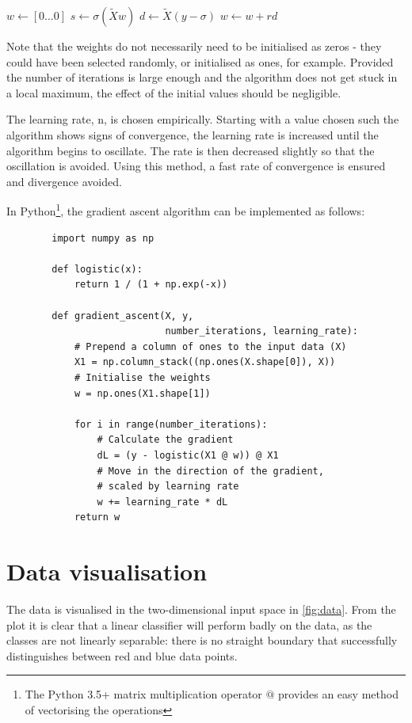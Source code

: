 \documentclass[a4paper]{article}
\begin{document}
    \begin{algorithmic}
            \State $w \gets [0 \dots 0]$ 
                \State $s \gets \sigma(\tilde{X}w)$
                \State $d \gets \tilde{X} (y - \sigma)$ 
                \State $w \gets w + rd $ 
            \EndFor
        \EndProcedure
    \end{algorithmic}

    Note that the weights do not necessarily need to be initialised as zeros - they could have been selected randomly, or
    initialised as ones, for example. Provided the number of iterations is large enough and the algorithm does not get
    stuck in a local maximum, the effect of the initial values should be negligible.

    The learning rate, n, is chosen empirically. Starting with a value chosen such the algorithm shows signs
    of convergence, the learning rate is increased until the algorithm begins to oscillate. The rate is then decreased
    slightly so that the oscillation is avoided. Using this method, a fast rate of convergence is ensured and divergence
    avoided.

    In Python\footnote{The Python 3.5+ matrix multiplication operator $@$ provides an easy method of vectorising the
    operations}, the gradient ascent algorithm can be implemented as follows:

    \begin{verbatim}
        import numpy as np

        def logistic(x):
            return 1 / (1 + np.exp(-x))

        def gradient_ascent(X, y,
                            number_iterations, learning_rate):
            # Prepend a column of ones to the input data (X)
            X1 = np.column_stack((np.ones(X.shape[0]), X))
            # Initialise the weights
            w = np.ones(X1.shape[1])

            for i in range(number_iterations):
                # Calculate the gradient
                dL = (y - logistic(X1 @ w)) @ X1
                # Move in the direction of the gradient,
                # scaled by learning rate
                w += learning_rate * dL
            return w
    \end{verbatim}

    \section{Data visualisation}\label{sec:data-visualisation}
    The data is visualised in the two-dimensional input space in \autoref{fig:data}. From the plot it is clear that a
    linear classifier will perform badly on the data, as the classes are not linearly separable: there is no straight
    boundary that successfully distinguishes between red and blue data points.
\end{document}
